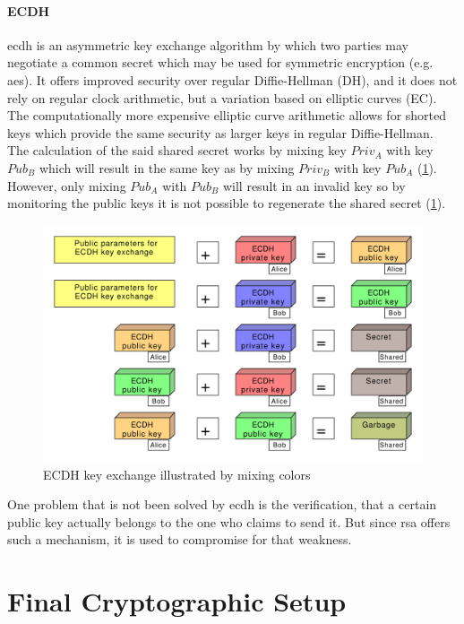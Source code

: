 \paragraph{ECDH}
\ac{ecdh} is an asymmetric key exchange algorithm by which two parties may negotiate a common secret which may be used
for symmetric encryption (e.g. \ac{aes}).
It offers improved security over regular Diffie-Hellman (DH), and it does not rely on regular clock arithmetic, but a
variation based on elliptic curves (EC).
The computationally more expensive elliptic curve arithmetic allows for shorted keys which provide the same security as
larger keys in regular Diffie-Hellman.
The calculation of the said shared secret works by mixing key $Priv_A$ with key $Pub_B$ which will result in the same
key as by mixing $Priv_B$ with key $Pub_A$ (\ref{fig:figure46}).
However, only mixing $Pub_A$ with $Pub_B$ will result in an invalid key so by monitoring the public keys it is not
possible to regenerate the shared secret (\ref{fig:figure46}).

\begin{figure}[H]
    \centering
    \includegraphics[width=1.0\textwidth]{./graphics/encryptionPattern}
    \caption{ECDH key exchange illustrated by mixing colors}
    \label{fig:figure46}
\end{figure}

One problem that is not been solved by \ac{ecdh} is the verification, that a certain public key actually belongs to the
one who claims to send it.
But since \ac{rsa} offers such a mechanism, it is used to compromise for that weakness.

\section{Final Cryptographic Setup}\label{sec:final-cryptographic-setup}

